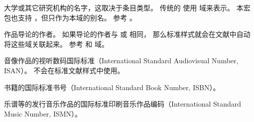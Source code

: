 \begin{fieldlist}



大学或其它研究机构的名字，这取决于条目类型。
传统的 \BibTeX 使用  域来表示。
本宏包也支持 ，但只作为本域的别名。
参考 。




作品导论的作者。
如果导论的作者与  或  相同，
那么标准样式就会在文献中自动将这些域关联起来。
参考  和  域。




音像作品的视听数码国际标准（International Standard Audiovisual Number,  ISAN）。
不会在标准文献样式中使用。




书籍的国际标准书号（International Standard Book Number, ISBN）。




乐谱等的发行音乐作品的国际标准印刷音乐作品编码（International Standard Music Number,  ISMN）。



\end{fieldlist}
